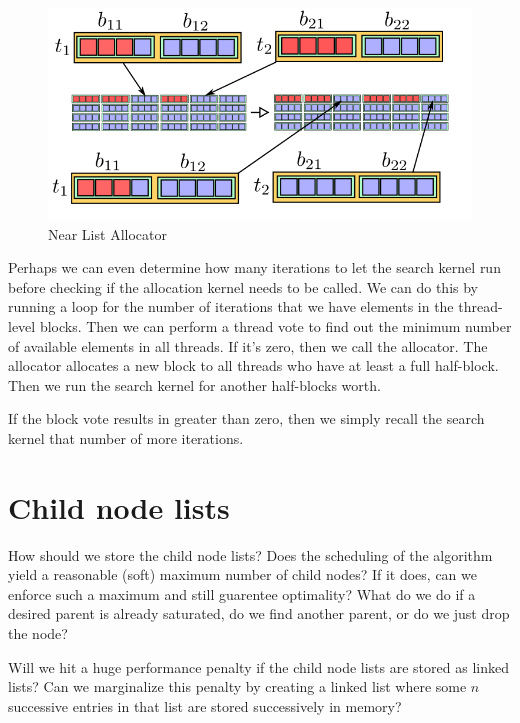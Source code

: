 \begin{figure}[H]
\begin{centering}
    \includegraphics[scale=1]{fig/near_list_allocator}
    \caption{Near List Allocator}
    \label{fig:near_alloc}
\end{centering} 
\end{figure}

Perhaps we can even determine how many iterations to let the search kernel run before checking if the allocation kernel needs to be called. We can do this by running a loop for the number of iterations that we have elements in the thread-level blocks. Then we can perform a thread vote to find out the minimum number of available elements in all threads. If it's zero, then we call the allocator. The allocator allocates a new block to all threads who have at least a full half-block. Then we run the search kernel for another half-blocks worth.

If the block vote results in greater than zero, then we simply recall the search kernel that number of more iterations.
 



\section{Child node lists}
\label{a:ChildNodeLists}
How should we store the child node lists? Does the scheduling of the algorithm yield a reasonable (soft) maximum number of child nodes? If it does, can we enforce such a maximum and still guarentee optimality? What do we do if a desired parent is already saturated, do we find another parent, or do we just drop the node?

Will we hit a huge performance penalty if the child node lists are stored as linked lists? Can we marginalize this penalty by creating a linked list where some $n$ successive entries in that list are stored successively in memory?

